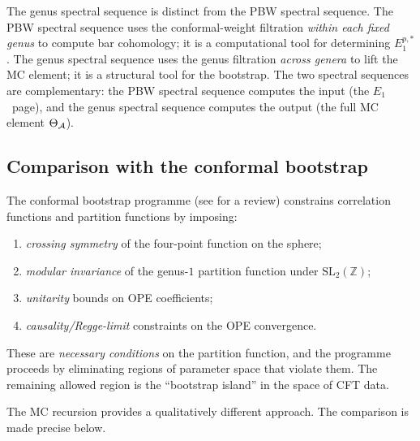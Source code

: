 \begin{remark}
\label{rem:thqg-VII-pbw-vs-genus}
The genus spectral sequence is distinct from the PBW spectral
sequence. The PBW spectral sequence uses the conformal-weight
filtration \emph{within each fixed genus} to compute bar
cohomology; it is a computational tool for determining
$E_1^{p,*}$. The genus spectral sequence uses the genus
filtration \emph{across genera} to lift the MC element; it is
a structural tool for the bootstrap. The two spectral sequences
are complementary: the PBW spectral sequence computes the input
(the $E_1$~page), and the genus spectral sequence computes the
output (the full MC element $\Theta_{\mathcal{A}}$).
\end{remark}

%
%

\subsection{Comparison with the conformal bootstrap}
\label{subsec:thqg-VII-bootstrap-comparison}

The conformal bootstrap programme (see \cite{BPRS15} for a review)
constrains correlation functions and partition functions by
imposing:
\begin{enumerate}[label=(\alph*)]
\item \emph{crossing symmetry} of the four-point function on the
 sphere;
\item \emph{modular invariance} of the genus-$1$ partition
 function under $\mathrm{SL}_2(\mathbb{Z})$;
\item \emph{unitarity} bounds on OPE coefficients;
\item \emph{causality/Regge-limit} constraints on the OPE
 convergence.
\end{enumerate}
These are \emph{necessary conditions} on the partition function,
and the programme proceeds by eliminating regions of parameter
space that violate them. The remaining allowed region is the
``bootstrap island'' in the space of CFT data.

The MC recursion provides a qualitatively different approach.
The comparison is made precise below.

